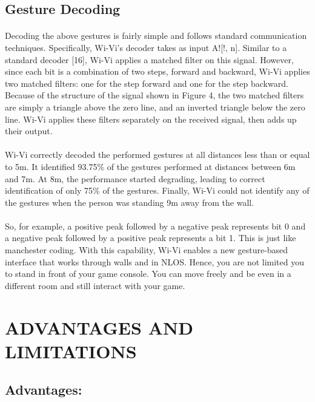 \documentclass[a4paper,12pt,oneside]{article}
\begin{document}
\subsection{Gesture Decoding}
\paragraph{}
Decoding the above gestures is fairly simple and follows standard communication
techniques. Specifically, Wi-Vi’s decoder takes as input A![!, n]. Similar to a standard decoder
[16], Wi-Vi applies a matched filter on this signal. However, since each bit is a combination of
two steps, forward and backward, Wi-Vi applies two matched filters: one for the step forward
and one for the step backward. Because of the structure of the signal shown in Figure 4, the two
matched filters are simply a triangle above the zero line, and an inverted triangle below the zero
line. Wi-Vi applies these filters separately on the received signal, then adds up their output.
\paragraph{}
Wi-Vi correctly decoded the performed gestures at all distances less than or
equal to 5m. It identified 93.75\% of the gestures performed at distances between
6m and 7m. At 8m, the performance started degrading, leading to correct identification
of only 75\% of the gestures. Finally, Wi-Vi could not identify any of
the gestures when the person was standing 9m away from the wall.


\paragraph{}
So, for example, a positive peak followed by a negative peak represents bit 0 and a
negative peak followed by a positive peak represents a bit 1. This is just like manchester coding.
With this capability, Wi-Vi enables a new gesture-based interface that works through walls and in
NLOS. Hence, you are not limited you to stand in front of your game console. You can move
freely and be even in a different room and still interact with your game.

\newpage
\section{ADVANTAGES AND LIMITATIONS}
\subsection{Advantages:}
\end{document}

